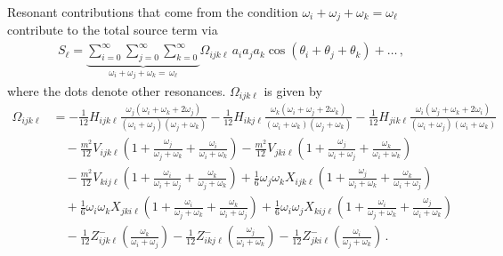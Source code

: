 \documentclass[letterpaper,11pt]{article}
\newcommand{\oi}{\omega_i}
\newcommand{\oj}{\omega_j}
\newcommand{\ok}{\omega_k}
\newcommand{\ol}{\omega_\ell}
\newcommand{\thi}{\theta_i}
\newcommand{\thj}{\theta_j}
\newcommand{\thk}{\theta_k}
\begin{document}
Resonant contributions that come from the condition $\oi + \oj + \ok = \ol$ contribute to the total source term via
\begin{align}
S_\ell = \underbrace{\sum_{i=0}^\infty \sum_{j=0}^\infty \sum_{k=0}^\infty}_{\oi + \oj + \ok = \, \ol} \Omega_{ijk\ell} \, a_i a_j a_k \cos \left( \thi + \thj + \thk \right) + \ldots \, ,
\end{align}
where the dots denote other resonances. $\Omega_{ijk\ell}$ is given by
\begin{align}
\label{omega}
\Omega_{ijk\ell} &= -\frac{1}{12}H_{ijk\ell} \frac{\oj (\oi + \ok +2\oj)}{(\oi + \oj)(\oj + \ok)} - \frac{1}{12} H_{ikj\ell} \frac{\ok (\oi + \oj + 2\ok)}{(\oi + \ok)(\oj + \ok)}- \frac{1}{12} H_{jik\ell} \frac{\oi (\oj + \ok +2\oi)}{(\oi + \oj)(\oi + \ok)} \nonumber \\
%
& \quad - \frac{m^2}{12} V_{ijk\ell} \left( 1 + \frac{\oj}{\oj + \ok} + \frac{\oi}{\oi + \ok} \right) - \frac{m^2}{12} V_{jki\ell} \left( 1 + \frac{\oj}{\oi + \oj} + \frac{\ok}{\oi + \ok} \right) \nonumber \\
%
& \quad - \frac{m^2}{12} V_{kij\ell} \left( 1 + \frac{\oi}{\oi + \oj} + \frac{\ok}{\oj + \ok} \right)  + \frac{1}{6} \oj \ok X_{ijk\ell} \left( 1 + \frac{\oj}{\oi + \ok} + \frac{\ok}{\oi + \oj} \right) \nonumber \\
%
& \quad + \frac{1}{6} \oi \ok X_{jki\ell} \left( 1 + \frac{\oi}{\oj + \ok} + \frac{\ok}{\oi + \oj} \right) + \frac{1}{6} \oi \oj X_{kij\ell} \left( 1 + \frac{\oi}{\oj + \ok} + \frac{\oj}{\oi + \ok} \right) \nonumber \\
%
& \quad - \frac{1}{12} Z^-_{ijk\ell} \left( \frac{\ok}{\oi + \oj} \right) - \frac{1}{12} Z^-_{ikj\ell} \left( \frac{\oj}{\oi + \ok} \right) - \frac{1}{12} Z^-_{jki\ell}  \left( \frac{\oi}{\oj + \ok} \right) \, .
\end{align}
\end{document}

